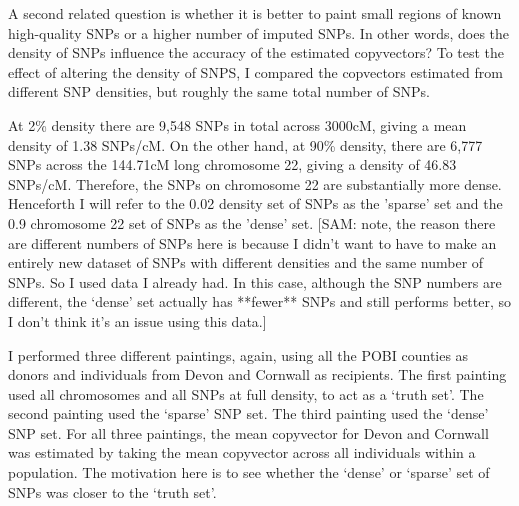 A second related question is whether it is better to paint small regions of known high-quality SNPs or a higher number of imputed SNPs. In other words, does the density of SNPs influence the accuracy of the estimated copyvectors? To test the effect of altering the density of SNPS, I compared the copvectors estimated from different SNP densities, but roughly the same total number of SNPs. 

At 2\% density there are 9,548 SNPs in total across 3000cM, giving a mean density of 1.38 SNPs/cM. On the other hand, at 90\% density, there are 6,777 SNPs across the 144.71cM long chromosome 22, giving a density of 46.83 SNPs/cM. Therefore, the SNPs on chromosome 22 are substantially more dense. Henceforth I will refer to the 0.02 density set of SNPs as the 'sparse' set and the 0.9 chromosome 22 set of SNPs as the 'dense' set. [SAM: note, the reason there are different numbers of SNPs here is because I didn't want to have to make an entirely new dataset of SNPs with different densities and the same number of SNPs. So I used data I already had. In this case, although the SNP numbers are different, the `dense' set actually has **fewer** SNPs and still performs better, so I don't think it's an issue using this data.]

I performed three different paintings, again, using all the POBI counties as donors and individuals from Devon and Cornwall as recipients. The first painting used all chromosomes and all SNPs at full density, to act as a `truth set'. The second painting used the `sparse' SNP set. The third painting used the `dense' SNP set. For all three paintings, the mean copyvector for Devon and Cornwall was estimated by taking the mean copyvector across all individuals within a population. The motivation here is to see whether the `dense' or `sparse' set of SNPs was closer to the `truth set'.  


